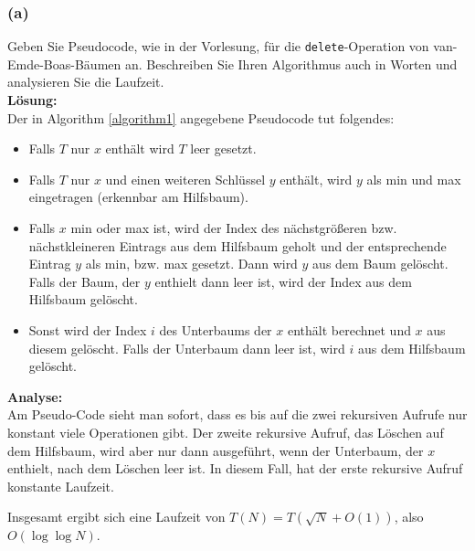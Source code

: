 \subsubsection*{(a)}


Geben Sie Pseudocode, wie in der Vorlesung, für die \lstinline|delete|-Operation von van-Emde-Boas-Bäumen an. Beschreiben Sie Ihren Algorithmus auch in Worten und analysieren Sie die Laufzeit.\\

\noindent\textbf{Lösung:}\\
Der in Algorithm \ref{algorithm1} angegebene Pseudocode tut folgendes:
\begin{itemize}
	\item Falls $T$ nur $x$ enthält wird $T$ leer gesetzt.
	\item Falls $T$ nur $x$ und einen weiteren Schlüssel $y$ enthält, wird $y$ als min und max eingetragen (erkennbar am Hilfsbaum).
	\item Falls $x$ min oder max ist, wird der Index des nächstgrößeren bzw. nächstkleineren Eintrags  aus dem Hilfsbaum geholt und der entsprechende Eintrag $y$ als min, bzw. max gesetzt. Dann wird $y$ aus dem Baum gelöscht. Falls der Baum, der $y$ enthielt dann leer ist, wird der Index aus dem Hilfsbaum gelöscht.
	\item Sonst wird der Index $i$ des Unterbaums der $x$ enthält berechnet und $x$ aus diesem gelöscht. Falls der Unterbaum dann leer ist, wird $i$ aus dem Hilfsbaum gelöscht.
\end{itemize}
\noindent\textbf{Analyse:}\\
Am Pseudo-Code sieht man sofort, dass es bis auf die zwei rekursiven Aufrufe nur konstant viele Operationen gibt. Der zweite rekursive Aufruf, das Löschen auf dem Hilfsbaum, wird aber nur dann ausgeführt, wenn der Unterbaum, der $x$ enthielt, nach dem Löschen leer ist. In diesem Fall, hat der erste rekursive Aufruf konstante Laufzeit.

Insgesamt ergibt sich eine Laufzeit von $T(N) = T(\sqrt{N} + O(1))$, also $O(\log\log N)$.


